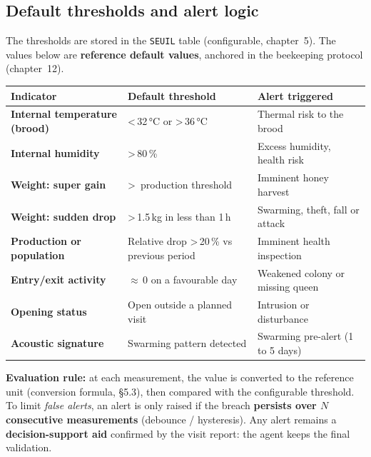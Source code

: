 \subsection{Default thresholds and alert logic}
The thresholds are stored in the \texttt{SEUIL} table (configurable, chapter~5).
The values below are \textbf{reference default values}, anchored in the
beekeeping protocol (chapter~12).
\begin{xltabular}{\textwidth}{>{\bfseries}p{4.4cm} X p{4.4cm}}
\toprule
\textbf{Indicator} & \textbf{Default threshold} & \textbf{Alert triggered} \\
\midrule
\endhead
Internal temperature (brood) & \textless\,32\,°C or \textgreater\,36\,°C & Thermal risk to the brood \\
Internal humidity & \textgreater\,80\,\% & Excess humidity, health risk \\
Weight: super gain & \textgreater\ production threshold & Imminent honey harvest \\
Weight: sudden drop & \textgreater\,1.5\,kg in less than 1\,h & Swarming, theft, fall or attack \\
Production or population & Relative drop \textgreater\,20\,\% vs previous period & Imminent health inspection \\
Entry/exit activity & $\approx$\,0 on a favourable day & Weakened colony or missing queen \\
Opening status & Open outside a planned visit & Intrusion or disturbance \\
Acoustic signature & Swarming pattern detected & Swarming pre-alert (1 to 5 days) \\
\bottomrule
\end{xltabular}
\begin{encadre}
\textbf{Evaluation rule:} at each measurement, the value is converted to the
reference unit (conversion formula, §5.3), then compared with the configurable
threshold. To limit \emph{false alerts}, an alert is only raised if the breach
\textbf{persists over $N$ consecutive measurements} (debounce / hysteresis).
Any alert remains a \textbf{decision-support aid} confirmed by the visit report:
the agent keeps the final validation.
\end{encadre}

